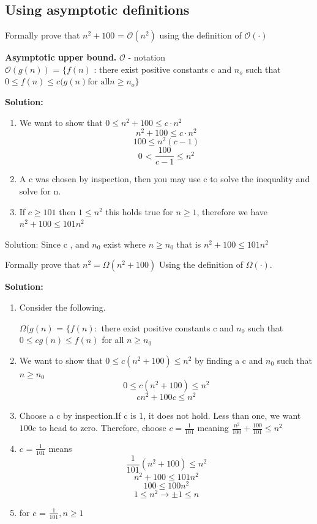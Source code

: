 \documentclass[11pt,fleqn]{book}
\begin{document}
\subsection{Using asymptotic definitions}
\begin{example}
Formally prove that $n^2+ 100 \text{ = }\mathcal{O}(n^2)$ using the definition of $\mathcal{O}(\cdot)$
\end{example}
\begin{definition} \textbf{Asymptotic upper bound.} $\mathcal{O}$ - notation\\
     $\mathcal{O}(g(n))$ = $\{f(n)$ : there exist positive constants c and  $n_o$ such that\\ $
    0 \leq f(n) \leq c(g(n) \text{for all} n \geq n_o\}$
    \end{definition}
\textbf{Solution:}
\begin{enumerate}
    \item We want to show that $0 \leq n^2 + 100 \leq c\cdot n^2$
    $$n^2 + 100 \leq c\cdot n^2$$
    $$100 \leq n^2(c - 1) $$
    $$0 \text{ < } \frac{100}{c - 1} \leq n^2$$
    \item A c was chosen by inspection, then you may use c to solve the inequality and solve for n. 
    \item If $c \geq 101 $ then $1 \leq n^2$ this holds true for $n \geq 1$, therefore we have $n^2 + 100 \leq 101n^2$
\end{enumerate} 
    \color{blue}Solution:  Since  c , and $n_0$ exist where  $n \geq n_0$ that is $n^2 + 100 \leq 101n^2 $\color{black}
\begin{example}
Formally prove that $n^2= \Omega(n^2+ 100)$ Using the definition of $\Omega(\cdot)$.
\end{example}
\textbf{Solution: } 
\begin{enumerate}
    \item Consider the following. \\
    \begin{definition}
    $\Omega(g(n) \text{ = } \{f(n) : $ there exist positive constants c and $n_0$ such that $0 \leq cg(n) \leq f(n)$ for all $n \geq n_0$
    \end{definition}
    \item We want to show that $0 \leq c(n^2 + 100) \leq n^2$ by finding a c and $n_0$ such that $n \geq n_0$
    $$0 \leq c(n^2 + 100) \leq n^2$$
    $$cn^2 + 100c \leq n^2$$
    \item Choose a c by inspection.If c is 1, it does not hold. Less than one, we want $100c$ to head to zero. Therefore, choose $ c= \frac{1}{101}$ meaning $\frac{n^2}{100} + \frac{100}{101} \leq n^2 $
    \item $c \text{ = }  \frac{1}{101}$ means $$\frac{1}{101}(n^2 + 100) \leq n^2$$
     $$n^2 + 100 \leq 101n^2$$
     $$100 \leq  100n^2$$
     $$1 \leq  n^2 \rightarrow \pm 1 \leq n$$
     \item for $c \text{ = }  \frac{1}{101}, n \geq 1 $
\end{enumerate}
\end{document}

